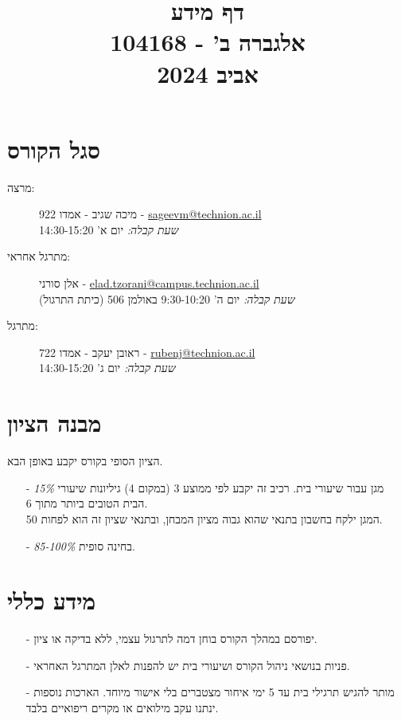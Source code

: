 \documentclass{article}
\title{דף מידע \\ אלגברה ב' - 104168 \\ אביב 2024}
\date{}
\begin{document}
\maketitle

\section*{סגל הקורס}

\begin{description}
\item[מרצה:]
מיכה שגיב
-
אמדו 922
-
\textenglish{\href{mailto:sageevm@technion.ac.il}{sageevm@technion.ac.il}}
\\
\emph{שעת קבלה:}
יום א' 14:30-15:20
\item[מתרגל אחראי:] 
אלן סורני
-
\textenglish{\href{mailto:elad.tzorani@campus.technion.ac.il}{elad.tzorani@campus.technion.ac.il}}
\\
\emph{שעת קבלה:}
יום ה' 9:30-10:20
באולמן 506 (כיתת התרגול)
\item[מתרגל:] 
ראובן יעקב
-
אמדו 722
-
\textenglish{\href{mailto:rubenj@technion.ac.il}{rubenj@technion.ac.il}}
\\
\emph{שעת קבלה:}
יום ג' 14:30-15:20
\end{description}

\section*{מבנה הציון}

הציון הסופי בקורס יקבע באופן הבא.

\begin{itemize}
\item[-] \emph{15\%}
מגן עבור שיעורי בית. רכיב זה יקבע לפי ממוצע 3 (במקום 4) גיליונות שיעורי הבית הטובים ביותר מתוך 6.
\\
המגן ילקח בחשבון בתנאי שהוא גבוה מציון המבחן, ובתנאי שציון זה הוא לפחות 50.
\item[-] \emph{85-100\%}
בחינה סופית.
\end{itemize}

\section*{מידע כללי}

\begin{itemize}
\item[-]
יפורסם במהלך הקורס בוחן דמה לתרגול עצמי, ללא בדיקה או ציון.
\item[-]
פניות בנושאי ניהול הקורס ושיעורי בית יש להפנות לאלן המתרגל האחראי.
\item[-]
מותר להגיש תרגילי בית עד 5 ימי איחור מצטברים בלי אישור מיוחד. הארכות נוספות ינתנו עקב מילואים או מקרים ריפואיים בלבד.
\end{itemize}
\end{document}
